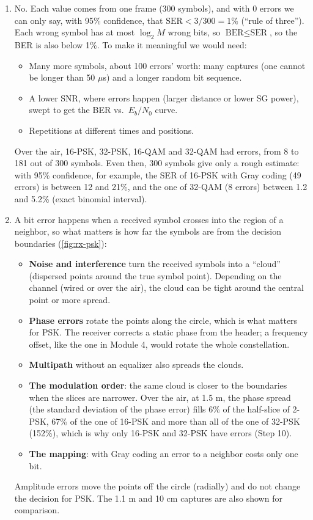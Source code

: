 \documentclass[11pt]{article}
\begin{document}
\begin{enumerate}[resume]
    \item No. Each value comes from one frame (300 symbols), and with 0 errors we can only say, with 95\% confidence, that $\text{SER} < 3/300 = 1\%$ (``rule of three''). Each wrong symbol has at most $\log_2 M$ wrong bits, so $\text{BER} \leq \text{SER}$, so the BER is also below 1\%. To make it meaningful we would need:
    \begin{itemize}
        \item Many more symbols, about 100 errors' worth: many captures (one cannot be longer than 50 $\mu$s) and a longer random bit sequence.
        \item A lower SNR, where errors happen (larger distance or lower SG power), swept to get the BER vs.\ $E_b/N_0$ curve.
        \item Repetitions at different times and positions.
    \end{itemize}
    Over the air, 16-PSK, 32-PSK, 16-QAM and 32-QAM had errors, from 8 to 181 out of 300 symbols. Even then, 300 symbols give only a rough estimate: with 95\% confidence, for example, the SER of 16-PSK with Gray coding (49 errors) is between 12 and 21\%, and the one of 32-QAM (8 errors) between 1.2 and 5.2\% (exact binomial interval).

    \item A bit error happens when a received symbol crosses into the region of a neighbor, so what matters is how far the symbols are from the decision boundaries (\cref{fig:rx-psk}):
    \begin{itemize}
        \item \textbf{Noise and interference} turn the received symbols into a ``cloud'' (dispersed points around the true symbol point). Depending on the channel (wired or over the air), the cloud can be tight around the central point or more spread.
        \item \textbf{Phase errors} rotate the points along the circle, which is what matters for PSK. The receiver corrects a static phase from the header; a frequency offset, like the one in Module 4, would rotate the whole constellation.
        \item \textbf{Multipath} without an equalizer also spreads the clouds.
        \item \textbf{The modulation order}: the same cloud is closer to the boundaries when the slices are narrower. Over the air, at 1.5 m, the phase spread (the standard deviation of the phase error) fills 6\% of the half-slice of 2-PSK, 67\% of the one of 16-PSK and more than all of the one of 32-PSK (152\%), which is why only 16-PSK and 32-PSK have errors (Step 10).
        \item \textbf{The mapping}: with Gray coding an error to a neighbor costs only one bit.
    \end{itemize}
    Amplitude errors move the points off the circle (radially) and do not change the decision for PSK. The 1.1 m and 10 cm captures are also shown for comparison.


\end{enumerate}
\end{document}
